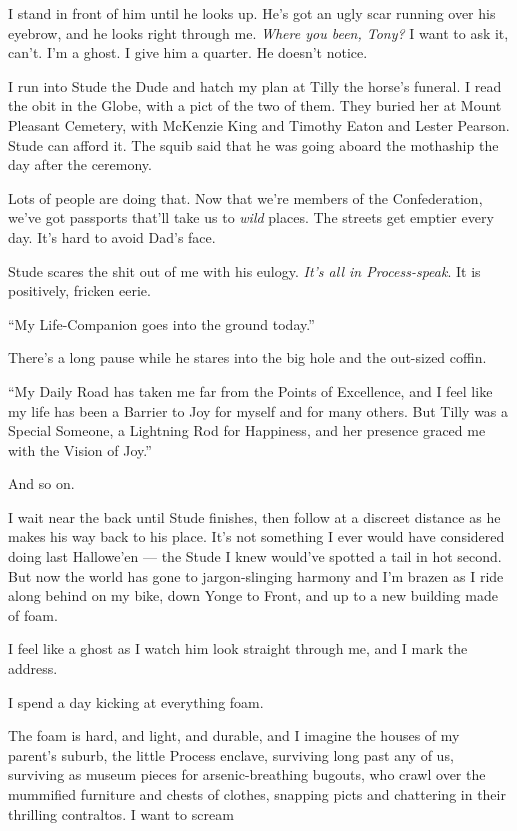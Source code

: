 I stand in front of him until he looks up. He's got an ugly scar
running over his eyebrow, and he looks right through me.
\emph{Where you been, Tony?} I want to ask it, can't. I'm a ghost.
I give him a quarter. He doesn't notice.

\tb

I run into Stude the Dude and hatch my plan at Tilly the horse's
funeral. I read the obit in the Globe, with a pict of the two of
them. They buried her at Mount Pleasant Cemetery, with McKenzie
King and Timothy Eaton and Lester Pearson. Stude can afford it. The
squib said that he was going aboard the mothaship the day after the
ceremony.

Lots of people are doing that. Now that we're members of the
Confederation, we've got passports that'll take us to \emph{wild}
places. The streets get emptier every day. It's hard to avoid Dad's
face.

Stude scares the shit out of me with his eulogy.
\emph{It's all in Process-speak}. It is positively, fricken eerie.

``My Life-Companion goes into the ground today.''

There's a long pause while he stares into the big hole and the
out-sized coffin.

``My Daily Road has taken me far from the Points of Excellence, and I feel like 
my life has been a Barrier to Joy for myself and for many others. But Tilly was 
a Special Someone, a Lightning Rod for Happiness, and her presence graced me 
with the Vision of Joy.''

And so on.

I wait near the back until Stude finishes, then follow at a
discreet distance as he makes his way back to his place. It's not
something I ever would have considered doing last Hallowe'en ---
the Stude I knew would've spotted a tail in hot second. But now the
world has gone to jargon-slinging harmony and I'm brazen as I ride
along behind on my bike, down Yonge to Front, and up to a new
building made of foam.

I feel like a ghost as I watch him look straight through me, and I
mark the address.

\tb

I spend a day kicking at everything foam.

The foam is hard, and light, and durable, and I imagine the houses
of my parent's suburb, the little Process enclave, surviving long
past any of us, surviving as museum pieces for arsenic-breathing
bugouts, who crawl over the mummified furniture and chests of
clothes, snapping picts and chattering in their thrilling
contraltos. I want to scream

